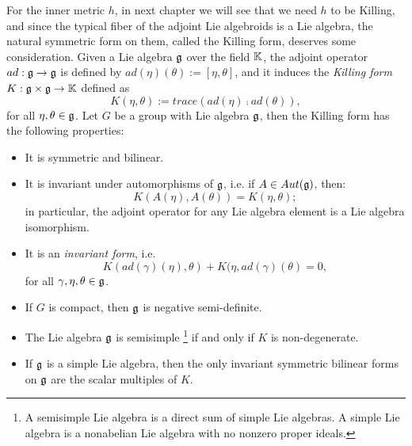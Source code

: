 For the inner metric $h$, in next chapter we will see that we need $h$ to be Killing, and since the typical fiber of the adjoint Lie algebroids is a Lie algebra, the natural symmetric form on them, called the Killing form, deserves some consideration. Given a Lie algebra $\mathfrak{g}$ over the field $\mathbb{K}$, the adjoint operator $ad: \mathfrak{g} \to \mathfrak{g}$ is defined by $ad(\eta)(\theta) := [\eta, \theta]$, and it induces the \emph{Killing form} $K: \mathfrak{g} \times \mathfrak{g} \to \mathbb{K}$ defined as
\begin{equation}
    K(\eta, \theta) := trace(ad(\eta) \comp ad(\theta)),
\end{equation}
for all $\eta, \theta \in \mathfrak{g}$. Let $G$ be a group with Lie algebra $\mathfrak{g}$, then the Killing form has the following properties:
\begin{itemize}
    
    \item It is symmetric and bilinear.
    
    \item It is invariant under automorphisms of $\mathfrak{g}$, i.e. if $A \in Aut(\mathfrak{g})$, then:
    \begin{equation*}
        K(A(\eta), A(\theta)) = K(\eta, \theta);
    \end{equation*}
    in particular, the adjoint operator for any Lie algebra element is a Lie algebra isomorphism.
    
    \item It is an \emph{invariant form}, i.e.
    \begin{equation*}
        K(ad(\gamma)(\eta), \theta) + K(\eta, ad(\gamma)(\theta) = 0,
    \end{equation*}
    for all $\gamma, \eta, \theta \in \mathfrak{g}$.
    
    \item If $G$ is compact, then $\mathfrak{g}$ is negative semi-definite.
    
    \item The Lie algebra $\mathfrak{g}$ is semisimple
    \footnote{A semisimple Lie algebra is a direct sum of simple Lie algebras. A simple Lie algebra is a nonabelian Lie algebra with no nonzero proper ideals.} if and only if $K$ is non-degenerate.
    
    \item If $\mathfrak{g}$ is a simple Lie algebra, then the only invariant symmetric bilinear forms on $\mathfrak{g}$ are the scalar multiples of $K$.
    
\end{itemize}
